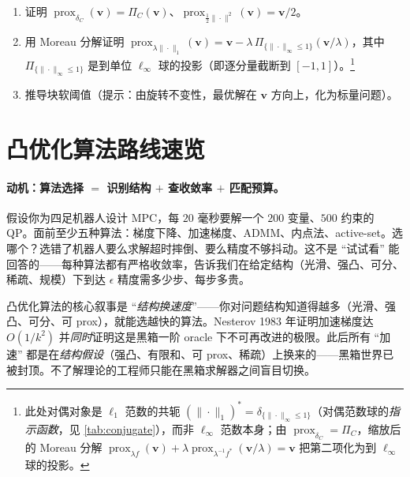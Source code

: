\begin{practice}
\begin{enumerate}
  \item 证明 $\operatorname{prox}_{\delta_C}(\mathbf v)=\Pi_C(\mathbf v)$、$\operatorname{prox}_{\frac12\|\cdot\|^2}(\mathbf v)=\mathbf v/2$。
  \item 用 Moreau 分解证明 $\operatorname{prox}_{\lambda\|\cdot\|_1}(\mathbf v)=\mathbf v-\lambda\,\Pi_{\{\|\cdot\|_\infty\le1\}}(\mathbf v/\lambda)$，其中 $\Pi_{\{\|\cdot\|_\infty\le1\}}$ 是到单位 $\ell_\infty$ 球的投影（即逐分量截断到 $[-1,1]$）。\footnote{此处对偶对象是 $\ell_1$ 范数的共轭 $(\|\cdot\|_1)^\ast=\delta_{\{\|\cdot\|_\infty\le1\}}$（对偶范数球的\emph{指示函数}，见 \cref{tab:conjugate}），而非 $\ell_\infty$ 范数本身；由 $\operatorname{prox}_{\delta_C}=\Pi_C$，缩放后的 Moreau 分解 $\operatorname{prox}_{\lambda f}(\mathbf v)+\lambda\operatorname{prox}_{\lambda^{-1}f^\ast}(\mathbf v/\lambda)=\mathbf v$ 把第二项化为到 $\ell_\infty$ 球的投影。}
  \item 推导块软阈值（提示：由旋转不变性，最优解在 $\mathbf v$ 方向上，化为标量问题）。
\end{enumerate}
\end{practice}

\section{凸优化算法路线速览}
\label{sec:cvx-algo}

\paragraph{动机：算法选择 $=$ 识别结构 $+$ 查收敛率 $+$ 匹配预算。}
假设你为四足机器人设计 MPC，每 $20$ 毫秒要解一个 $200$ 变量、$500$ 约束的 QP。面前至少五种算法：梯度下降、加速梯度、ADMM、内点法、active-set。选哪个？选错了机器人要么求解超时摔倒、要么精度不够抖动。这不是 “试试看” 能回答的——每种算法都有严格收敛率，告诉我们在给定结构（光滑、强凸、可分、稀疏、规模）下到达 $\epsilon$ 精度需多少步、每步多贵。

\begin{insight}\label{ins:structure-speed}
凸优化算法的核心叙事是 “\emph{结构换速度}”——你对问题结构知道得越多（光滑、强凸、可分、可 prox），就能选越快的算法。Nesterov 1983 年证明加速梯度达 $O(1/k^2)$ 并\emph{同时}证明这是黑箱一阶 oracle 下不可再改进的极限。此后所有 “加速” 都是在\emph{结构假设}（强凸、有限和、可 prox、稀疏）上换来的——黑箱世界已被封顶。不了解理论的工程师只能在黑箱求解器之间盲目切换。
\end{insight}

